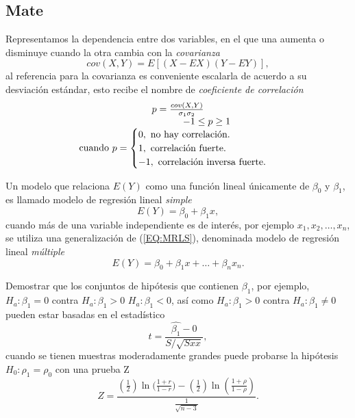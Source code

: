 \subsection {Mate}
Representamos la dependencia entre dos variables, en el que una aumenta o disminuye cuando la otra cambia con la \emph{covarianza}
\begin{equation}
cov(X,Y)=E[(X-EX)(Y-EY)],
\end{equation}
al referencia para la covarianza es conveniente escalarla de acuerdo a su desviación estándar, esto recibe el nombre de  \emph{coeficiente de correlación}
\begin{equation}\centering
\begin{matrix}
p=\frac{cov(X,Y)}{\sigma_1\sigma_2}\\
\qquad\qquad\qquad-1\leq p\geq 1\\
\text{cuando }p=\begin{cases}
0,\ \text{no hay correlación.}\\
1,\ \text{correlación fuerte.}\\
-1,\ \text{correlación inversa fuerte.}\end{cases}\end{matrix}
\end{equation}


Un modelo que relaciona $E(Y)$ como una función lineal únicamente de $\beta_0$ y $\beta_1$, es llamado modelo de regresión lineal \emph{simple}
\begin{equation}
E(Y)=\beta_0+\beta_1x\label{EQ:MRLS},
\end{equation}
cuando más de una variable independiente es de interés, por ejemplo $x_1,x_2,\ldots,x_n$, se utiliza una generalización de (\ref{EQ:MRLS}), denominada modelo de regresión lineal \emph{múltiple}
\begin{equation}
E(Y)=\beta_0+\beta_1x+\ldots+\beta_nx_n.
\end{equation}

Demostrar que los conjuntos de hipótesis que contienen $\beta_1$, por ejemplo, $H_a\colon \beta_1 = 0$ contra $H_a\colon \beta_1 > 0$ $H_a\colon \beta_1 < 0$, así como $H_a\colon \beta_1 > 0$ contra $H_a\colon \beta_1 \neq 0$ pueden estar basadas en el estadístico
\begin{equation}
t=\frac{\hat{\beta_1}-0}{S/\sqrt{S{xx}}},
\end{equation}
cuando se tienen muestras moderadamente grandes puede probarse la hipótesis $H_0\colon \rho_1=\rho_0$ con una prueba Z
\begin{equation}
Z=\frac{(\frac{1}{2})\ln({\frac{1+r}{1-r})}-(\frac{1}{2})\ln(\frac{1+\rho}{1-\rho})}{\frac{1}{\sqrt{n-3}}}.
\end{equation}

